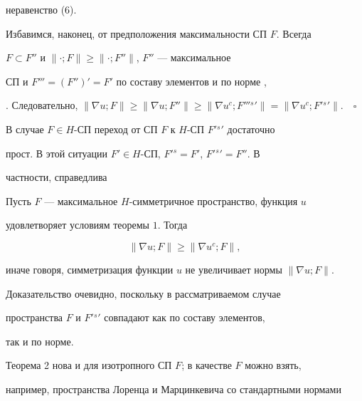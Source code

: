 неравенство (6). 


 


Избавимся, наконец, от предположения максимальности СП $F$. Всегда 


$F\subset F''$ и $\|\cdot;F\|\ge\|\cdot;F''\|$, $F''$ --- максимальное 


СП и $F'''=(F'')'=F'$ по составу элементов и по норме \cite{7}, 


\cite{10}. Следовательно, $\|\nabla u;F\|\ge\|\nabla u;F''\|\ge 


\|\nabla u^c;F{}'''{}^s{}'\|= \|\nabla 


u^c;F{}'{}^s{}'\|$.$\quad\square$ 


\medskip 


 


В случае $F\in H$-СП переход от СП $F$ к $H$-СП $F{}'{}^s{}'$ достаточно 


прост. В этой ситуации $F'\in H$-СП, $F{}'{}^s=F'$, $F{}'{}^s{}'=F''$. В 


частности, справедлива 


 


\begin{thm} 


Пусть $F$ --- максимальное $H$-симметричное пространство, функция $u$ 


удовлетворяет условиям теоремы $1$. Тогда 


$$ 


\|\nabla u;F\|\ge\|\nabla u^c;F\|, 


$$ 


иначе говоря, симметризация функции $u$ не увеличивает нормы $\|\nabla 


u;F\|$. 


\end{thm} 


 


Доказательство очевидно, поскольку в рассматриваемом случае 


пространства $F$ и $F{}'{}^s{}'$ совпадают как по составу элементов, 


так и по норме. 


 


Теорема 2 нова и для изотропного СП $F$; в качестве $F$ можно взять, 


например, пространства Лоренца и Марцинкевича со стандартными нормами 


